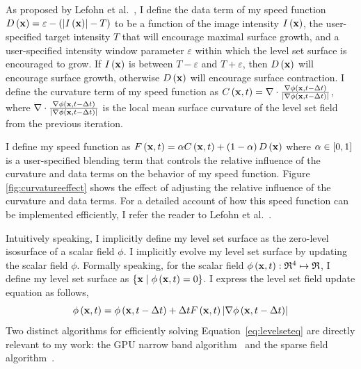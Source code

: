 As proposed by Lefohn et al.~\cite{Lefohn-2003-MICCAI,Lefohn-2003-Vis,Lefohn-2004}, I define the data term of my speed function $D \left( {\mathbf x} \right) = \varepsilon - \left( \left| I \left( {\mathbf x} \right) \right| - T \right) $ to be a function of the image intensity $I \left( {\mathbf x} \right)$, the user-specified target intensity $T$ that will encourage maximal surface growth, and a user-specified intensity window parameter $\varepsilon $ within which the level set surface is encouraged to grow. If $I \left( {\mathbf x} \right)$ is between $T-\varepsilon $ and $T+\varepsilon $, then $D \left( {\mathbf x} \right) $ will encourage surface growth, otherwise $D \left( {\mathbf x} \right) $ will encourage surface contraction. I define the curvature term of my speed function as $ C \left( {\mathbf x} , t \right) = \nabla \cdot \frac{\nabla \mathit{\phi} \left( {\mathbf x} , t - \Delta t \right) }{ \left| \nabla \mathit{\phi} \left( {\mathbf x} , t - \Delta t \right) \right| } $, where $ \nabla \cdot \frac{\nabla \mathit{\phi} \left( {\mathbf x} , t - \Delta t \right) }{ \left| \nabla \mathit{\phi} \left( {\mathbf x} , t - \Delta t \right) \right| } $ is the local mean surface curvature of the level set field from the previous iteration.

I define my speed function as $ F \left( {\mathbf x} , t \right) = \alpha C \left( {\mathbf x} , t \right) + \left( 1 - \alpha \right) D \left( {\mathbf x} \right) $ where $\alpha \in \left[ 0 , 1 \right] $ is a user-specified blending term that controls the relative influence of the curvature and data terms on the behavior of my speed function. Figure \ref{fig:curvatureeffect} shows the effect of adjusting the relative influence of the curvature and data terms. For a detailed account of how this speed function can be implemented efficiently, I refer the reader to Lefohn et al.~\cite{Lefohn-2004}.

Intuitively speaking, I implicitly define my level set surface as the zero-level isosurface of a scalar field $\phi$. I implicitly evolve my level set surface by updating the scalar field $\phi$. Formally speaking, for the scalar field $ \mathit{\phi} \left( {\mathbf x} , t \right) : \mathfrak{R}^4 \mapsto \mathfrak{R} $, I define my level set surface as $ \left\{ {\mathbf x} \mid \mathit{\phi} \left( {\mathbf x} , t \right) = 0 \right\}$. I express the level set field update equation as follows,
\begin{equation}
    \phixt = \phixtmdt + \Delta t F \leftbracket \boldx , t \rightbracket \leftvbracket \nabla \phixtmdt \label{eq:levelseteq}
\rightvbracket
\end{equation}
Two distinct algorithms for efficiently solving Equation~\ref{eq:levelseteq} are directly relevant to my work: the GPU narrow band algorithm~\cite{Lefohn-2003-MICCAI,Lefohn-2003-Vis,Cates-2004,Lefohn-2004,Jeong-2009} and the sparse field algorithm~\cite{Whitaker-1998,Peng-1999}.


